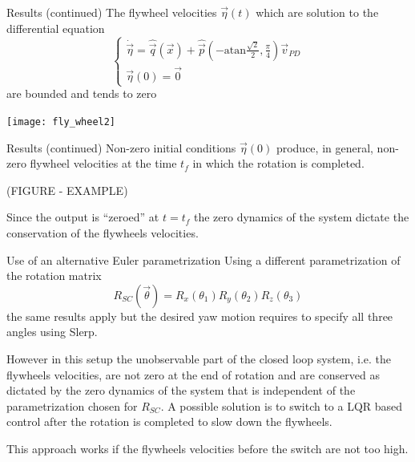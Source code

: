\begin{frame}{Results (continued)}
  The flywheel velocities $\vec{\eta}(t)$ which are
  solution to the differential equation
  \[
  \begin{cases}
    \dot{\vec{\eta}} = \hat{\vec{q}}(\vec{x}) + \hat{\vec{p}}\left(-\mathrm{atan}\frac{\sqrt{2}}{2},\frac{\pi}{4}\right)\vec{v}_{PD}\\
    \vec{\eta}(0) = \vec{0}
  \end{cases}
  \]
  are bounded and tends to zero
  \par
  \centering
  \texttt{[image: fly\_wheel2]}
\end{frame}

\begin{frame}{Results (continued)}
  Non-zero initial conditions $\vec{\eta}(0)$ produce, in general,
  non-zero flywheel velocities at the time $t_f$ in which the
  rotation is completed.
  \par
  (FIGURE - EXAMPLE)
  \par
  Since the output is ``zeroed'' at $t=t_f$ the zero dynamics of the system
  dictate the conservation of the flywheels velocities.
\end{frame}

\begin{frame}{Use of an alternative Euler parametrization}
  Using a different parametrization of the rotation matrix
  \[
  R_{SC}(\vec{\theta}) = R_x(\theta_1)R_y(\theta_2)R_z(\theta_3)
  \]
  the same results apply but the desired yaw motion requires to specify
  all three angles using Slerp.
  \par
  However in this setup the unobservable part of the closed loop system, i.e.
  the flywheels velocities, are not zero at the end of rotation and are conserved
  as dictated by the zero dynamics of the system that is independent of the parametrization
  chosen for $R_{SC}$.
  A possible solution is to switch to a LQR based control after the rotation is completed to slow down the flywheels.
  \par
  This approach works if the flywheels velocities before the switch are not too high.
\end{frame}

